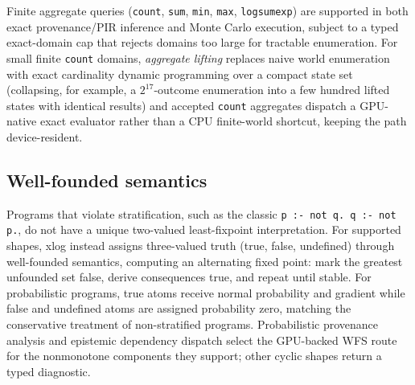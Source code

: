 Finite aggregate queries (\texttt{count}, \texttt{sum}, \texttt{min}, \texttt{max}, \texttt{logsumexp}) are supported in both exact provenance/PIR inference and Monte Carlo execution, subject to a typed exact-domain cap that rejects domains too large for tractable enumeration. For small finite \texttt{count} domains, \emph{aggregate lifting} replaces naive world enumeration with exact cardinality dynamic programming over a compact state set (collapsing, for example, a $2^{17}$-outcome enumeration into a few hundred lifted states with identical results) and accepted \texttt{count} aggregates dispatch a GPU-native exact evaluator rather than a CPU finite-world shortcut, keeping the path device-resident.

\subsection{Well-founded semantics}

Programs that violate stratification, such as the classic \texttt{p :- not q.\ q :- not p.}, do not have a unique two-valued least-fixpoint interpretation. For supported shapes, xlog instead assigns three-valued truth (true, false, undefined) through well-founded semantics, computing an alternating fixed point: mark the greatest unfounded set false, derive consequences true, and repeat until stable. For probabilistic programs, true atoms receive normal probability and gradient while false and undefined atoms are assigned probability zero, matching the conservative treatment of non-stratified programs. Probabilistic provenance analysis and epistemic dependency dispatch select the GPU-backed WFS route for the nonmonotone components they support; other cyclic shapes return a typed diagnostic.
